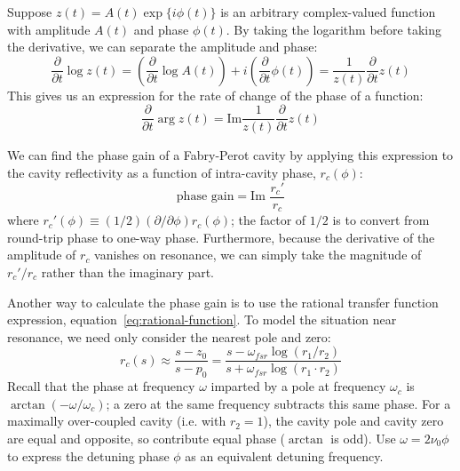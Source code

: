 Suppose $z(t)=A(t) \exp\{i \phi(t)\}$ is an arbitrary complex-valued
function with amplitude $A(t)$ and phase $\phi(t)$. By taking the
logarithm before taking the derivative, we can separate the amplitude
and phase:
%
\begin{equation}
\frac{\partial}{\partial t} \log z(t) = \left(\frac{\partial}{\partial t} \log A(t)\right) + i \left(\frac{\partial}{\partial t} \phi(t)\right)
= \frac{1}{z(t)} \frac{\partial}{\partial t} z(t)
\end{equation}
%
This gives us an expression for the rate of change of the phase of a function:
%
\begin{equation}
\frac{\partial}{\partial t} \arg z(t) = \text{Im} \frac{1}{z(t)} \frac{\partial}{\partial t} z(t)
\end{equation}

We can find the phase gain of a Fabry-Perot cavity by applying this expression to the cavity reflectivity as a function of intra-cavity phase, $r_c(\phi)$:
\begin{equation}
\text{phase gain} = \text{Im\ } \frac{r_c'}{r_c}
\end{equation}
where $r_c'(\phi)\equiv(1/2)(\partial/\partial\phi)r_c(\phi)$; the factor of $1/2$ is to convert from round-trip phase to one-way phase.  Furthermore, because the derivative of the amplitude of $r_c$ vanishes on resonance, we can simply take the magnitude of $r_c'/r_c$ rather than the imaginary part.

Another way to calculate the phase gain is to use the rational transfer function expression, equation~\ref{eq:rational-function}.  To model the situation near resonance, we need only consider the nearest pole and zero:
\[
r_c(s) \approx \frac{s - z_0}{s - p_0}
 = \frac{s - \omega_{fsr}\log \left(r_1 / r_2\right)}
        {s + \omega_{fsr}\log \left(r_1 \cdot r_2\right)}
\]
Recall that the phase at frequency $\omega$ imparted by a pole at
frequency $\omega_c$ is $\arctan\left(-\omega/\omega_c\right)$; a zero
at the same frequency subtracts this same phase.  For a maximally
over-coupled cavity (i.e. with $r_2 = 1$), the cavity pole and cavity
zero are equal and opposite, so contribute equal phase ($\arctan$ is
odd).  Use $\omega = 2\nu_0\phi$ to express the detuning phase $\phi$
as an equivalent detuning frequency.

